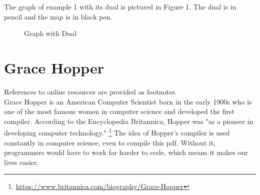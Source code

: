 \documentclass{article}
\begin{document}
The graph of example 1 with its dual is pictured in Figure 1. The dual is in pencil and the map is in black pen.
\graphicspath{ {dual} }
\begin{figure}[h]
	\centering
	\caption{Graph with Dual}
\end{figure}

\clearpage
\header

\section*{Grace Hopper}

References to online resources are provided as footnotes. \\

Grace Hopper is an American Computer Scientist born in the early 1900s who is one of the most famous women in computer science and developed the first compiler. According to the Encyclopedia Britannica, Hopper was "as a pioneer in developing computer technology."
\footnote{\url{https://www.britannica.com/biography/Grace-Hopper}}
The idea of Hopper's compiler is used constantly in computer science, even to compile this pdf. Without it, programmers would have to work far harder to code, which means it makes our lives easier.
\end{document}
